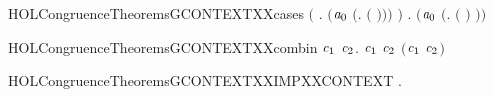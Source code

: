 \begin{SaveVerbatim}{HOLCongruenceTheoremsGCONTEXTXXcases}
       \ensuremath{(}\HOLSymConst{\HOLTokenExists{}} . \ensuremath{(}\ensuremath{\HOLBoundVar{a}\sb{\mathrm{0}}} \HOLSymConst{\ensuremath{=}} \ensuremath{(}\HOLTokenLambda{}.   \ensuremath{(} \ensuremath{)}\ensuremath{)}\ensuremath{)} \HOLSymConst{\HOLTokenConj{}}  \ensuremath{)} \HOLSymConst{\HOLTokenDisj{}}
       \HOLSymConst{\HOLTokenExists{}} . \ensuremath{(}\ensuremath{\HOLBoundVar{a}\sb{\mathrm{0}}} \HOLSymConst{\ensuremath{=}} \ensuremath{(}\HOLTokenLambda{}.  \ensuremath{(} \ensuremath{)} \ensuremath{)}\ensuremath{)} \HOLSymConst{\HOLTokenConj{}}  
\end{SaveVerbatim}
\newcommand{\HOLCongruenceTheoremsGCONTEXTXXcases}{\UseVerbatim{HOLCongruenceTheoremsGCONTEXTXXcases}}
\begin{SaveVerbatim}{HOLCongruenceTheoremsGCONTEXTXXcombin}
\HOLTokenTurnstile{} \HOLSymConst{\HOLTokenForall{}}\ensuremath{\HOLBoundVar{c}\sb{\mathrm{1}}} \ensuremath{\HOLBoundVar{c}\sb{\mathrm{2}}}.  \ensuremath{\HOLBoundVar{c}\sb{\mathrm{1}}} \HOLSymConst{\HOLTokenConj{}}  \ensuremath{\HOLBoundVar{c}\sb{\mathrm{2}}} \HOLSymConst{\HOLTokenImp{}}  \ensuremath{(}\ensuremath{\HOLBoundVar{c}\sb{\mathrm{1}}} \HOLConst{\HOLTokenCompose} \ensuremath{\HOLBoundVar{c}\sb{\mathrm{2}}}\ensuremath{)}
\end{SaveVerbatim}
\newcommand{\HOLCongruenceTheoremsGCONTEXTXXcombin}{\UseVerbatim{HOLCongruenceTheoremsGCONTEXTXXcombin}}
\begin{SaveVerbatim}{HOLCongruenceTheoremsGCONTEXTXXIMPXXCONTEXT}
\HOLTokenTurnstile{} \HOLSymConst{\HOLTokenForall{}}.   \HOLSymConst{\HOLTokenImp{}}  
\end{SaveVerbatim}
\newcommand{\HOLCongruenceTheoremsGCONTEXTXXIMPXXCONTEXT}{\UseVerbatim{HOLCongruenceTheoremsGCONTEXTXXIMPXXCONTEXT}}
